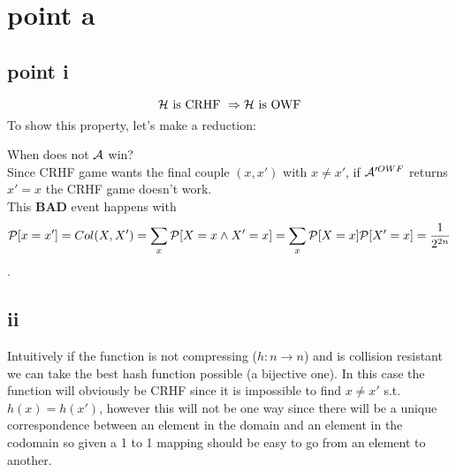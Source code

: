 
\section{point a}
\subsection{point i}%

\[
    \H \text{ is CRHF } \Rightarrow \H \text{ is OWF}
\]
To show this property, let's make a reduction:
\begin{figure}[h!]
   \centering
   \sdinit{}
\end{figure}

When does not $\A$ win?\\
Since CRHF game  wants the final couple $(x, x')$ with $x\not= x'$, if
$\A'^{OWF}$ returns $x'=x$ the CRHF game doesn't work.\\

This \textbf{BAD} event happens with 
\[
    \P [ x=x' ]=Col(X, X')=\sum_{x}^{} \P [ X=x \wedge X'=x ]= \sum_{x}^{} \P [X=x] \P [ X'=x ] = \frac{1}{2^{2n}}        
\].

\subsection{ii}%

Intuitively if the function is not compressing ($h:n \to n$) and is collision resistant we can take the best hash function possible (a bijective one). In this case the function will obviously be CRHF since it is impossible to find $x\neq x'$ s.t. $h(x)=h(x')$, however this will not be one way since there will be a unique correspondence between an element in the domain and an element in the codomain so given a 1 to 1 mapping should be easy to go from an element to another.


